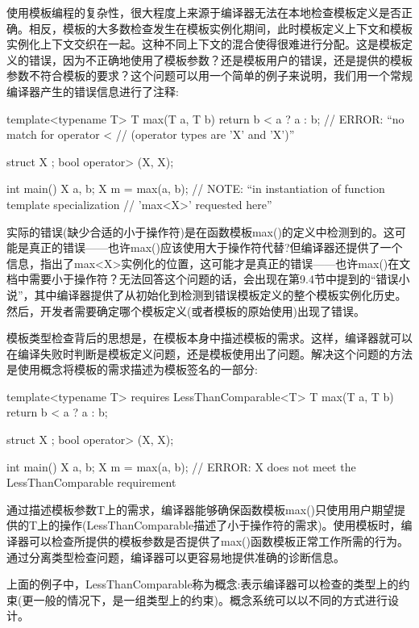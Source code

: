 
使用模板编程的复杂性，很大程度上来源于编译器无法在本地检查模板定义是否正确。相反，模板的大多数检查发生在模板实例化期间，此时模板定义上下文和模板实例化上下文交织在一起。这种不同上下文的混合使得很难进行分配。这是模板定义的错误，因为不正确地使用了模板参数？还是模板用户的错误，还是提供的模板参数不符合模板的要求？这个问题可以用一个简单的例子来说明，我们用一个常规编译器产生的错误信息进行了注释:

\begin{cpp}
template<typename T>
T max(T a, T b)
{
	return b < a ? a : b; // ERROR: “no match for operator <
	// (operator types are ’X’ and ’X’)”
}

struct X {
};
bool operator> (X, X);

int main()
{
	X a, b;
	X m = max(a, b); // NOTE: “in instantiation of function template specialization
					// ’max<X>’ requested here”
}
\end{cpp}

实际的错误(缺少合适的小于操作符)是在函数模板max()的定义中检测到的。这可能是真正的错误——也许max()应该使用大于操作符代替?但编译器还提供了一个信息，指出了max<X>实例化的位置，这可能才是真正的错误——也许max()在文档中需要小于操作符？无法回答这个问题的话，会出现在第9.4节中提到的“错误小说”，其中编译器提供了从初始化到检测到错误模板定义的整个模板实例化历史。然后，开发者需要确定哪个模板定义(或者模板的原始使用)出现了错误。

模板类型检查背后的思想是，在模板本身中描述模板的需求。这样，编译器就可以在编译失败时判断是模板定义问题，还是模板使用出了问题。解决这个问题的方法是使用概念将模板的需求描述为模板签名的一部分:

\begin{cpp}
template<typename T> requires LessThanComparable<T>
T max(T a, T b)
{
	return b < a ? a : b;
}

struct X { };
bool operator> (X, X);

int main()
{
	X a, b;
	X m = max(a, b); // ERROR: X does not meet the LessThanComparable requirement
}
\end{cpp}

通过描述模板参数T上的需求，编译器能够确保函数模板max()只使用用户期望提供的T上的操作(LessThanComparable描述了小于操作符的需求)。使用模板时，编译器可以检查所提供的模板参数是否提供了max()函数模板正常工作所需的行为。通过分离类型检查问题，编译器可以更容易地提供准确的诊断信息。

上面的例子中，LessThanComparable称为概念:表示编译器可以检查的类型上的约束(更一般的情况下，是一组类型上的约束)。概念系统可以以不同的方式进行设计。

